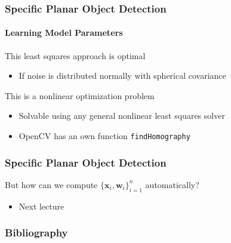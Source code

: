 \documentclass[xetex,professionalfont]{beamer}
\renewcommand{\vec}[1]{\ensuremath{\mathbf{#1}}}
\newcommand{\vw}{\vec{w}}
\newcommand{\vx}{\vec{x}}
\let\oldemph\emph
\renewcommand\emph[1]{\textcolor{tuwcvl_inf_red}{#1}}
\begin{document}
\begin{frame}
\frametitle{Specific Planar Object Detection}
\framesubtitle{Learning Model Parameters}

This least squares approach is optimal
\begin{itemize}
	\item If noise is distributed normally with spherical covariance %
\end{itemize}

\bigskip
This is a nonlinear optimization problem
\begin{itemize}
	\item Solvable using any general nonlinear least squares solver %
	\item OpenCV has an own function \texttt{findHomography}
\end{itemize}

\end{frame}


\begin{frame}
\frametitle{Specific Planar Object Detection}

But how can we compute $\{\vx_i,\vw_i\}_{i=1}^n$ automatically?
\begin{itemize}
	\item Next lecture
\end{itemize}

\end{frame}


\renewcommand\emph[1]{\oldemph{#1}}

\begin{frame}
\frametitle{Bibliography}

\printbibliography

\end{frame}
\end{document}
